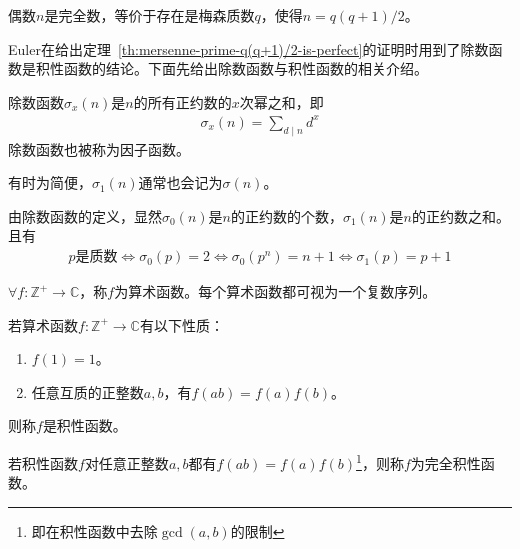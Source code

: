 \begin{theorem}\label{th:mersenne-prime-q(q+1)/2-is-perfect}
  偶数$n$是完全数，等价于存在是梅森质数$q$，使得$n=q(q+1)/2$。
\end{theorem}

Euler在给出定理~\ref{th:mersenne-prime-q(q+1)/2-is-perfect}的证明时用到了除数函数是积性函数的结论。下面先给出除数函数与积性函数的相关介绍。

\begin{definition}
  除数函数$\sigma_x(n)$是$n$的所有正约数的$x$次幂之和，即
  \begin{align*}
    \sigma_x(n)=\sum_{d\mid n} d^x
  \end{align*}
  除数函数也被称为因子函数。
\end{definition}
有时为简便，$\sigma_1(n)$通常也会记为$\sigma(n)$。

由除数函数的定义，显然$\sigma_0(n)$是$n$的正约数的个数，$\sigma_1(n)$是$n$的正约数之和。且有
\begin{align*}
  p\text{是质数} \iff \sigma_0(p) = 2 \iff \sigma_0(p^n) = n + 1 \iff \sigma_1(p) = p + 1
\end{align*}

\begin{definition}
  $\forall f:\mathbb{Z^+}\to\mathbb{C}$，称$f$为算术函数。每个算术函数都可视为一个复数序列。
\end{definition}

\begin{definition}
  若算术函数$f:\mathbb{Z^+}\to \mathbb{C}$有以下性质：
  \begin{enumerate}
  \item $f(1) = 1$。
  \item 任意互质的正整数$a,b$，有$f(ab) = f(a)f(b)$。
  \end{enumerate}
  则称$f$是积性函数。
\end{definition}

\begin{definition}[完全积性函数]
  若积性函数$f$对任意正整数$a,b$都有$f(ab)=f(a)f(b)$\footnote{即在积性函数中去除$\gcd(a,b)$的限制}，则称$f$为完全积性函数。
\end{definition}

